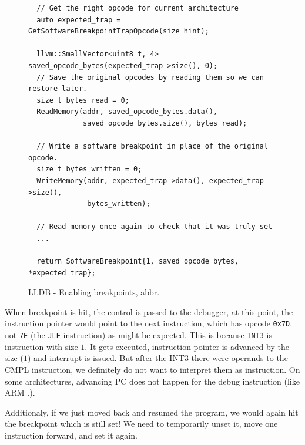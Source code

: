 \begin{figure}\label{fig:lldb-breakpoints-enable}
    \begin{verbatim}
  // Get the right opcode for current architecture
  auto expected_trap = GetSoftwareBreakpointTrapOpcode(size_hint);

  llvm::SmallVector<uint8_t, 4> saved_opcode_bytes(expected_trap->size(), 0);
  // Save the original opcodes by reading them so we can restore later.
  size_t bytes_read = 0;
  ReadMemory(addr, saved_opcode_bytes.data(),
             saved_opcode_bytes.size(), bytes_read);

  // Write a software breakpoint in place of the original opcode.
  size_t bytes_written = 0;
  WriteMemory(addr, expected_trap->data(), expected_trap->size(),
              bytes_written);

  // Read memory once again to check that it was truly set
  ...

  return SoftwareBreakpoint{1, saved_opcode_bytes, *expected_trap};
    \end{verbatim}
    \caption{LLDB - Enabling breakpoints, abbr.}
\end{figure}

When breakpoint is hit, the control is passed to the debugger, at this point,
the instruction pointer would point to the next instruction, which has opcode
\texttt{0x7D}, not \texttt{7E} (the \texttt{JLE} instruction) as might be
expected. This is because \texttt{INT3} is instruction with size $1$. It gets
executed, instruction pointer is advanced by the size ($1$) and interrupt is
issued. But after the INT3 there were operands to the CMPL instruction, we
definitely do not want to interpret them as instruction. On some architectures,
advancing PC does not happen for the debug instruction (like ARM .).

Additionaly, if we just moved back and resumed the program, we would again hit
the breakpoint which is still set! We need to temporarily unset it, move one
instruction forward, and set it again. 

